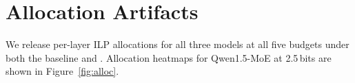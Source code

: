 \section{Allocation Artifacts}
\label{app:allocation}

We release per-layer ILP allocations for all three models at all five budgets under both the baseline and \method. Allocation heatmaps for Qwen1.5-MoE at 2.5\,bits are shown in Figure~\ref{fig:alloc}.
